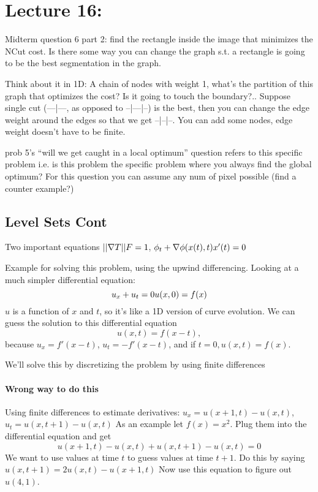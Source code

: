 \pagebreak

\section{Lecture  16: }
\label{sec:lecture-16}
Midterm question 6 part 2: find the rectangle inside the image that
minimizes the NCut cost.  Is there some way you can change the graph
s.t. a rectangle is going to be the best segmentation in the graph.

Think about it in 1D: A chain of nodes with weight 1, what's the
partition of this graph that optimizes the cost? Is it going to touch
the boundary?..
Suppose single cut (---|---, as opposed to --|---|--) is the best,
then you can change the edge weight around the edges so that we get
--|--|--. You can add some nodes, edge weight doesn't have to be
finite.

prob 5's ``will we get caught in a local optimum'' question refers to
this specific problem i.e. is this problem the specific problem where
you always find the global optimum? For this question you can assume
any num of pixel possible (find a counter example?)

\subsection{Level Sets Cont}
\label{sec:level-sets-cont}
Two important equations $|| \nabla T || F = 1$,  $\phi_t + \nabla
\phi(x(t), t) x'(t) = 0$

Example for solving this problem, using the upwind differencing.
Looking at a much simpler differential equation:
\begin{equation}
  \label{eq:34}
  u_x + u_t = 0\\
  u(x,0) = f(x)
\end{equation}
$u$ is a function of $x$ and $t$, so it's like a 1D version of curve
evolution. We can guess the solution to this differential
equation $$u(x,t) = f(x-t),$$ because $u_x = f'(x-t)$, $u_t =
-f'(x-t)$, and if $t=0, u(x,t) = f(x)$.

We'll solve this by discretizing the problem by using finite
differences

\paragraph{Wrong way to do this}
\label{sec:wrong-way-do}
Using finite differences to estimate derivatives: $u_x = u(x+1, t) -
u(x, t)$, $u_t = u(x, t+1) - u(x, t)$
As an example let $f(x) = x^2$. Plug them into the differential
equation and get $$u(x+1, t) - u(x,t) +u(x, t+1) - u(x,t)= 0$$
We want to use values at time $t$ to guess values at time $t+1$. 
Do this by saying $u(x,t+1) = 2u(x,t) -u(x+1, t)$
Now use this equation to figure out $u(4,1)$. 

